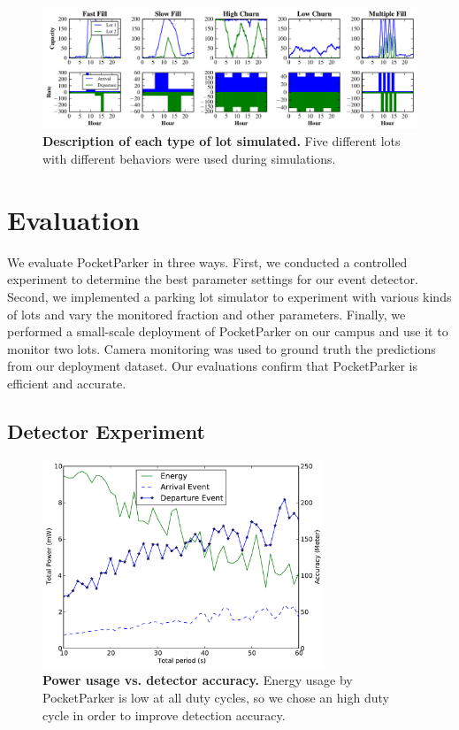 \begin{figure}[t]
\centering
\includegraphics[width=\textwidth]{./simulator/figures/lots.pdf}

\caption{\textbf{Description of each type of lot simulated.} Five different
lots with different behaviors were used during simulations.}

\label{fig-lotsdescription}
\end{figure}

\section{Evaluation}
\label{sec-evaluation}

We evaluate PocketParker in three ways. First, we conducted a controlled
experiment to determine the best parameter settings for our event detector.
Second, we implemented a parking lot simulator to experiment with various
kinds of lots and vary the monitored fraction and other parameters. Finally,
we performed a small-scale deployment of PocketParker on our campus and use
it to monitor two lots. Camera monitoring was used to ground truth the
predictions from our deployment dataset. Our evaluations confirm that
PocketParker is efficient and accurate.

\subsection{Detector Experiment}

\begin{figure}[t]
\centering
\includegraphics[width=3.325in]{./figures/Energy_accuracy.pdf}

\caption{\textbf{Power usage vs. detector accuracy.} Energy usage by
PocketParker is low at all duty cycles, so we chose an high duty cycle in
order to improve detection accuracy.}

\label{fig-energy}
\end{figure}

